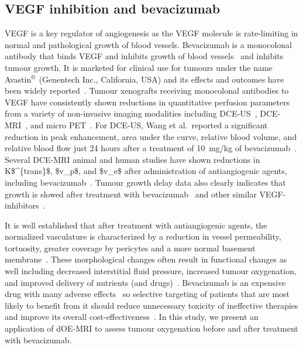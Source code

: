 \subsection{VEGF inhibition and bevacizumab}

\acs{VEGF} is a key regulator of angiogenesis as the \acs{VEGF} molecule is rate-limiting in normal and pathological growth of blood vessels.
Bevacizumab is a monocolonal antibody that binds \acs{VEGF} and inhibits growth of blood vessels~\cite{Ferrara:2004fa} and inhibits tumour growth.
It is marketed for clinical use for tumours under the name Avastin$^{\tiny{\textrm{\textcopyright}}}$ (Genentech Inc., California, USA) and its effects and outcomes have been widely reported~\cite{Keating:2014gt, Pavlidis:2013bj, Barnett:2013bt, Kumler:2014gb}.
Tumour xenografts receiving monocolonal antibodies to VEGF have consistently shown reductions in quantitative perfusion parameters from a variety of non-invasive imaging modalities including \acs{DCE-US}~\cite{Wang:2015bb}, \acs{DCE-MRI}~\cite{OConnor:2009cg}, and micro PET~\cite{Nagengast:2007hx}.
For \ac{DCE-US}, Wang et al.\ reported a significant reduction in peak enhancement, area under the curve, relative blood volume, and relative blood flow just 24 hours after a treatment of 10~mg/kg of bevacizumab~\cite{Wang:2015bb}.  
Several \ac{DCE-MRI} animal and human studies have shown reductions in \acs{K$^{trans}$}, \acs{$v_p$}, and \acs{$v_e$} after administration of antiangiogenic agents, including bevacizumab~\cite{Yang:2018hz}.
Tumour growth delay data also clearly indicates that growth is slowed after treatment with bevacizumab~\cite{Yang:2018hz} and other similar \acs{VEGF}-inhibitors~\cite{OConnor:2012ie}.

It is well established that after treatment with antiangiogenic agents, the normalized vasculature is characterized by a reduction in vessel permeability, tortuosity, greater coverage by pericytes and a more normal basement membrane~\cite{Jain:2005gk}. 
These morphological changes often result in functional changes as well including decreased interstitial fluid pressure, increased tumour oxygenation, and improved delivery of nutrients (and drugs)~\cite{Jain:2005gk}.
Bevacizumab is an expensive drug with many adverse effects~\cite{Keating:2014gt} so selective targeting of patients that are most likely to benefit from it should reduce unnecessary toxicity of ineffective therapies and improve its overall cost-effectiveness~\cite{Barnett:2013bt}.
In this study, we present an application of \acs{dOE-MRI} to assess tumour oxygenation before and after treatment with bevacizumab.

